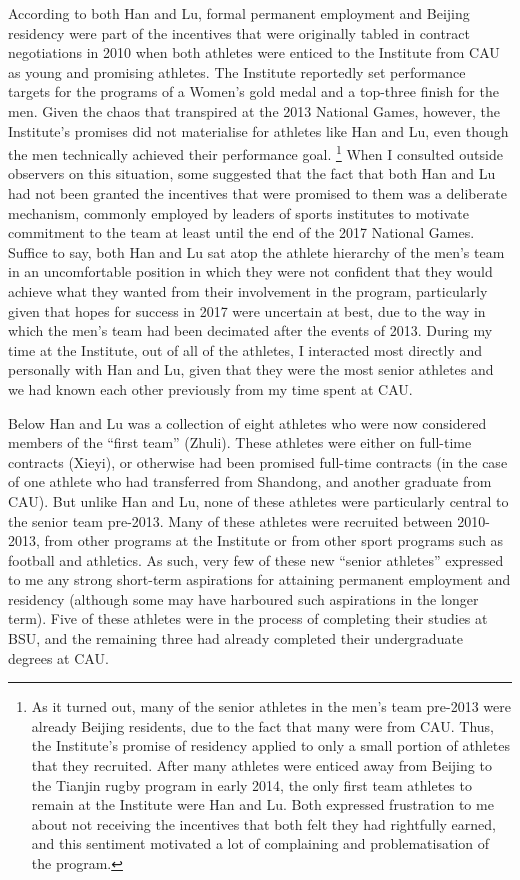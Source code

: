 \begin{CJK}{UTF8}{gbsn}
According to both Han and Lu, formal permanent employment and Beijing residency were part of the incentives that were originally tabled in contract negotiations in 2010 when both athletes were enticed to the Institute from CAU as young and promising athletes.  The Institute reportedly set performance targets for the programs of a Women's gold medal and a top-three finish for the men.  Given the chaos that transpired at the 2013 National Games, however, the Institute's promises did not materialise for athletes like Han and Lu, even though the men technically achieved their performance goal.
    \footnote{As it turned out, many of the senior athletes in the men's team pre-2013 were already Beijing residents, due to the fact that many were from CAU.  Thus, the Institute's promise of residency applied to only a small portion of athletes that they recruited.  After many athletes were enticed away from Beijing to the Tianjin rugby program in early 2014, the only first team athletes to remain at the Institute were Han and Lu.  Both expressed frustration to me about not receiving the incentives that both felt they had rightfully earned, and this sentiment motivated a lot of complaining and problematisation of the program.}
When I consulted outside observers on this situation, some suggested that the fact that both Han and Lu had not been granted the incentives that were promised to them was a deliberate mechanism, commonly employed by leaders of sports institutes to motivate commitment to the team at least until the end of the 2017 National Games.  Suffice to say, both Han and Lu sat atop the athlete hierarchy of the men's team in an uncomfortable position in which they were not confident that they would achieve what they wanted from their involvement in the program, particularly given that hopes for success in 2017 were uncertain at best, due to the way in which the men's team had been decimated after the events of 2013. During my time at the Institute, out of all of the athletes, I interacted most directly and personally with Han and Lu, given that they were the most senior athletes and we had known each other previously from my time spent at CAU.


Below Han and Lu was a collection of eight athletes who were now considered members of the ``first team'' (Zhuli).   These athletes were either on full-time contracts (Xieyi), or otherwise had been promised full-time contracts (in the case of one athlete who had transferred from Shandong, and another graduate from CAU). But unlike Han and Lu, none of these athletes were particularly central to the senior team pre-2013.  Many of these athletes were recruited between 2010-2013, from other programs at the Institute or from other sport programs such as football and athletics.  As such, very few of these new ``senior athletes'' expressed to me any strong short-term aspirations for attaining permanent employment and residency (although some may have harboured such aspirations in the longer term). Five of these athletes were in the process of completing their studies at BSU, and the remaining three had already completed their undergraduate degrees at CAU.


\end{CJK}
